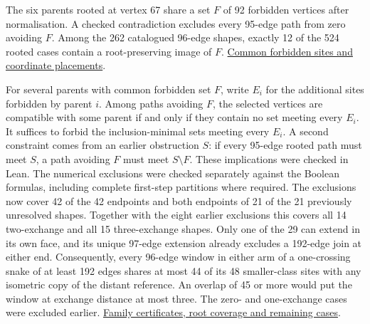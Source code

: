 \documentclass[11pt,a4paper]{article}
\theoremstyle{definition}
\theoremstyle{remark}
\begin{document}
The six parents rooted at vertex 67 share a set \(F\) of 92 forbidden
vertices after normalisation. A checked contradiction excludes every
95-edge path from zero avoiding \(F\). Among the 262 catalogued
96-edge shapes, exactly 12 of the 524 rooted cases contain a
root-preserving image of \(F\).
\href{https://github.com/hironaka-iori/Snake-in-the-box-in-9/tree/main/milestones/262-common-forbidden-sites}{Common forbidden sites and coordinate placements}.

For several parents with common forbidden set \(F\), write \(E_i\)
for the additional sites forbidden by parent \(i\). Among paths
avoiding \(F\), the selected vertices are compatible with some parent
if and only if they contain no set meeting every \(E_i\). It suffices
to forbid the inclusion-minimal sets meeting every \(E_i\). A second
constraint comes from an earlier obstruction \(S\): if every 95-edge
rooted path must meet \(S\), a path avoiding \(F\) must meet
\(S\setminus F\). These implications were checked in Lean. The
numerical exclusions were checked separately against the Boolean
formulas, including complete first-step partitions where required.
The exclusions now cover 42 of the 42 endpoints and both endpoints of 21 of the 21 previously unresolved shapes. Together with the eight earlier exclusions this covers all 14 two-exchange and all 15 three-exchange shapes. Only one of the 29 can extend in its own face, and its unique 97-edge extension already excludes a 192-edge join at either end. Consequently, every 96-edge window in either arm of a one-crossing snake of at least 192 edges shares at most 44 of its 48 smaller-class sites with any isometric copy of the distant reference. An overlap of 45 or more would put the window at exchange distance at most three. The zero- and one-exchange cases were excluded earlier.
\href{https://github.com/hironaka-iori/Snake-in-the-box-in-9/tree/main/milestones/263-distant-family-certificates}{Family certificates, root coverage and remaining cases}.
\end{document}
